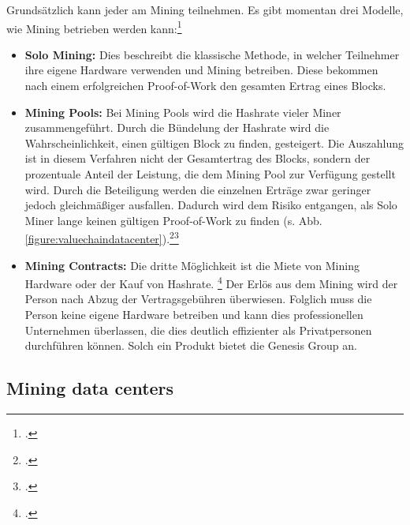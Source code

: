 Grundsätzlich kann jeder am Mining teilnehmen. Es gibt momentan drei Modelle, wie Mining betrieben werden
kann:\footcite[Cf.][p. 53, pp. 57]{bhaskar2015bitcoin}
\begin{itemize}
    \item \textbf{Solo Mining: }Dies beschreibt die klassische Methode, in welcher Teilnehmer ihre eigene Hardware
    verwenden und Mining betreiben. Diese bekommen nach einem erfolgreichen Proof-of-Work den gesamten Ertrag eines Blocks.
    \item \textbf{Mining Pools: }Bei Mining Pools wird die Hashrate vieler Miner zusammengeführt. Durch die Bündelung
    der Hashrate wird die Wahrscheinlichkeit, einen gültigen Block zu finden, gesteigert. Die Auszahlung ist in diesem
    Verfahren nicht der Gesamtertrag des Blocks, sondern der prozentuale Anteil der Leistung, die dem Mining Pool zur
    Verfügung gestellt wird. Durch die Beteiligung werden die einzelnen Erträge zwar geringer jedoch gleichmäßiger
    ausfallen. Dadurch wird dem Risiko entgangen, als Solo Miner lange keinen gültigen Proof-of-Work zu finden
    (s. Abb. \ref{figure:valuechaindatacenter}).\footcite[Cf.][pp. 58]{bhaskar2015bitcoin}\footcite[Cf.][p. 327]{derks2018chaining}
    \item \textbf{Mining Contracts: }Die dritte Möglichkeit ist die Miete von Mining Hardware oder der Kauf von
    Hashrate. \footcite[Cf.][pp. 58]{bhaskar2015bitcoin} Der Erlös aus dem Mining wird der Person nach Abzug der
    Vertragsgebühren überwiesen. Folglich muss die Person keine eigene Hardware betreiben und kann dies professionellen
    Unternehmen überlassen, die dies deutlich effizienter als Privatpersonen durchführen können. Solch ein Produkt bietet die
    Genesis Group an.
\end{itemize}

\subsection{Mining data centers} \label{toc:miningrechenzentren}

